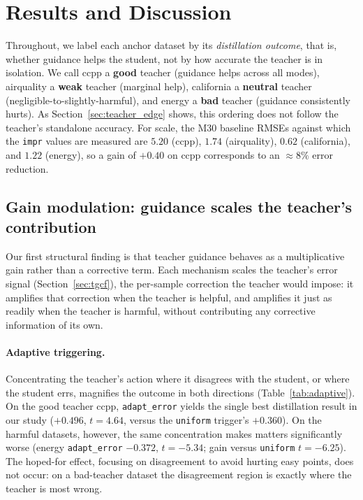 \section{Results and Discussion}
\label{sec:results}

Throughout, we label each anchor dataset by its \textit{distillation outcome}, that is,
whether guidance helps the student, not by how accurate the teacher is in isolation. We
call ccpp a \textbf{good} teacher (guidance helps across all modes), airquality a
\textbf{weak} teacher (marginal help), california a \textbf{neutral} teacher
(negligible-to-slightly-harmful), and energy a \textbf{bad} teacher (guidance consistently
hurts). As Section~\ref{sec:teacher_edge} shows, this ordering does not follow the teacher's
standalone accuracy. For scale, the M30 baseline RMSEs against which the \texttt{impr}
values are measured are $5.20$ (ccpp), $1.74$ (airquality), $0.62$ (california), and $1.22$
(energy), so a gain of $+0.40$ on ccpp corresponds to an $\approx\!8\%$ error reduction.

\subsection{Gain modulation: guidance scales the teacher's contribution}
\label{sec:sharpener}

Our first structural finding is that teacher guidance behaves as a multiplicative gain
rather than a corrective term. Each mechanism scales the teacher's error signal
(Section~\ref{sec:tgcf}), the per-sample correction the teacher would impose: it amplifies
that correction when the teacher is helpful, and amplifies it just as readily when the
teacher is harmful, without contributing any corrective information of its own.

\paragraph{Adaptive triggering.}
Concentrating the teacher's action where it disagrees with the student, or where the
student errs, magnifies the outcome in both directions (Table~\ref{tab:adaptive}). On the
good teacher ccpp, \texttt{adapt\_error} yields the single best distillation result in our
study ($+0.496$, $t=4.64$, versus the \texttt{uniform} trigger's $+0.360$). On the harmful
datasets, however, the same concentration makes matters significantly worse (energy
\texttt{adapt\_error} $-0.372$, $t=-5.34$; gain versus \texttt{uniform} $t=-6.25$). The
hoped-for effect, focusing on disagreement to avoid hurting easy points, does not occur: on
a bad-teacher dataset the disagreement region is exactly where the teacher is most wrong.

